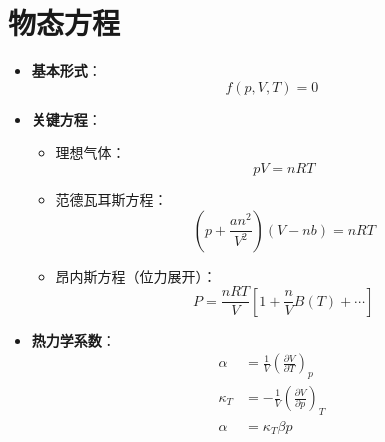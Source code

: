 \documentclass[12pt]{article}
\begin{document}
\section{物态方程}
\begin{itemize}
    \item \textbf{基本形式}：
    \begin{equation}
        f(p, V, T) = 0
    \end{equation}
    \item \textbf{关键方程}：
    \begin{itemize}
        \item 理想气体：
        \begin{equation}
            pV = nRT
        \end{equation}
        \item 范德瓦耳斯方程：
        \begin{equation}
            \left( p + \frac{an^2}{V^2} \right)(V - nb) = nRT
        \end{equation}
        \item 昂内斯方程（位力展开）：
        \begin{equation}
            P = \frac{nRT}{V} \left[ 1 + \frac{n}{V}B(T) + \cdots \right]
        \end{equation}
    \end{itemize}
    \item \textbf{热力学系数}：
    \begin{align}
        \alpha &= \frac{1}{V} \left( \frac{\partial V}{\partial T} \right)_p \\
        \kappa_T &= -\frac{1}{V} \left( \frac{\partial V}{\partial p} \right)_T \\
        \alpha &= \kappa_T \beta p
    \end{align}
\end{itemize}
\end{document}
